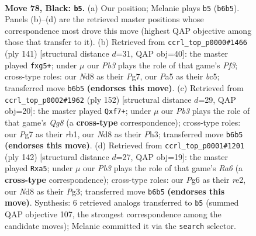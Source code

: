 \documentclass[11pt]{article}
\begin{document}
\clearpage

\begin{figure}[p]\centering
\begin{subfigure}{0.46\textwidth}\centering
\resizebox{\linewidth}{!}{%
\newchessgame
\chessboard[
  setfen={3n4/2k3p1/1p4p1/p1P5/1p6/8/K7/2q5 b - - 0 78},
  showmover=false,
  pgfstyle=straightmove, color=movearrow, markmove={b6-b5}
]}
\caption{}
\end{subfigure}\hfill
\begin{subfigure}{0.46\textwidth}\centering
\resizebox{\linewidth}{!}{%
\newchessgame
\chessboard[
  setfen={8/5kp1/5p2/2B3PP/b4K2/8/8/8 b - - 0 71},
  showmover=false,
  pgfstyle=straightmove, color=movearrow, markmove={f6-g5}
]}
\caption{}
\end{subfigure}
\\[4pt]
\begin{subfigure}{0.46\textwidth}\centering
\resizebox{\linewidth}{!}{%
\newchessgame
\chessboard[
  setfen={6Q1/3k1p2/8/2q1P3/8/7P/6PK/1r6 w - - 0 77},
  showmover=false,
  pgfstyle=straightmove, color=movearrow, markmove={g8-f7}
]}
\caption{}
\end{subfigure}\hfill
\begin{subfigure}{0.46\textwidth}\centering
\resizebox{\linewidth}{!}{%
\newchessgame
\chessboard[
  setfen={8/7k/R7/p3P2p/7P/6PK/4r3/8 w - - 6 72},
  showmover=false,
  pgfstyle=straightmove, color=movearrow, markmove={a6-a5}
]}
\caption{}
\end{subfigure}
\caption{\textbf{Move 78, Black: \texttt{b5}.} (a) Our position; Melanie plays \texttt{b5} (\texttt{b6b5}). Panels (b)--(d) are the retrieved master positions whose correspondence most drove this move (highest QAP objective among those that transfer to it). (b) Retrieved from \texttt{ccrl\_top\_p0000\#1466} (ply 141) [structural distance $d$=31, QAP obj=40]: the master played \texttt{fxg5+}; under $\mu$ our \emph{Pb3} plays the role of that game's \emph{Pf3}; cross-type roles: our \emph{N}d8 as their \emph{P}g7, our \emph{P}a5 as their \emph{b}c5; transferred move \texttt{b6b5} \textbf{(endorses this move)}. (c) Retrieved from \texttt{ccrl\_top\_p0002\#1962} (ply 152) [structural distance $d$=29, QAP obj=20]: the master played \texttt{Qxf7+}; under $\mu$ our \emph{Pb3} plays the role of that game's \emph{Qg8} (a \textbf{cross-type} correspondence); cross-type roles: our \emph{P}g7 as their \emph{r}b1, our \emph{N}d8 as their \emph{P}h3; transferred move \texttt{b6b5} \textbf{(endorses this move)}. (d) Retrieved from \texttt{ccrl\_top\_p0001\#1201} (ply 142) [structural distance $d$=27, QAP obj=19]: the master played \texttt{Rxa5}; under $\mu$ our \emph{Pb3} plays the role of that game's \emph{Ra6} (a \textbf{cross-type} correspondence); cross-type roles: our \emph{P}g6 as their \emph{r}e2, our \emph{N}d8 as their \emph{P}g3; transferred move \texttt{b6b5} \textbf{(endorses this move)}. Synthesis: 6 retrieved analogs transferred to \texttt{b5} (summed QAP objective 107, the strongest correspondence among the candidate moves); Melanie committed it via the \texttt{search} selector.}
\label{fig:thought-m155}
\end{figure}
\end{document}
